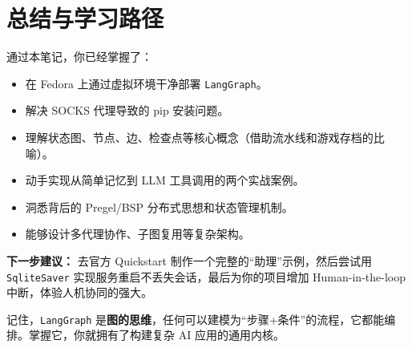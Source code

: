 \documentclass[12pt,a4paper]{ctexart}
\newcommand{\langgraph}{\texttt{LangGraph}}
\begin{document}
\section{总结与学习路径}
\label{sec:conclusion}

通过本笔记，你已经掌握了：
\begin{itemize}
    \item 在 Fedora 上通过虚拟环境干净部署 \langgraph{}。
    \item 解决 SOCKS 代理导致的 pip 安装问题。
    \item 理解状态图、节点、边、检查点等核心概念（借助流水线和游戏存档的比喻）。
    \item 动手实现从简单记忆到 LLM 工具调用的两个实战案例。
    \item 洞悉背后的 Pregel/BSP 分布式思想和状态管理机制。
    \item 能够设计多代理协作、子图复用等复杂架构。
\end{itemize}

\textbf{下一步建议：} 去官方 Quickstart 制作一个完整的“助理”示例，然后尝试用 \texttt{SqliteSaver} 实现服务重启不丢失会话，最后为你的项目增加 Human-in-the-loop 中断，体验人机协同的强大。

记住，\langgraph{} 是\textbf{图的思维}，任何可以建模为“步骤+条件”的流程，它都能编排。掌握它，你就拥有了构建复杂 AI 应用的通用内核。
\end{document}
